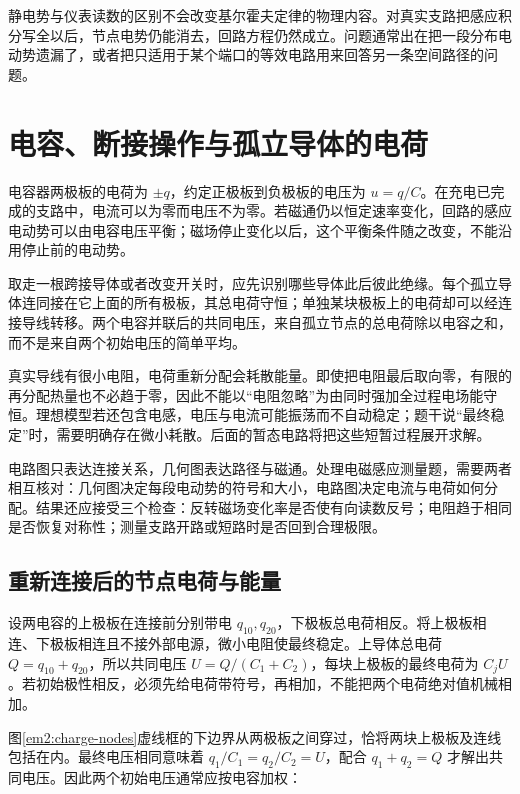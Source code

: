 静电势与仪表读数的区别不会改变基尔霍夫定律的物理内容。对真实支路把感应积分写全以后，节点电势仍能消去，回路方程仍然成立。问题通常出在把一段分布电动势遗漏了，或者把只适用于某个端口的等效电路用来回答另一条空间路径的问题。



\section{电容、断接操作与孤立导体的电荷}

电容器两极板的电荷为 $\pm q$，约定正极板到负极板的电压为 $u=q/C$。在充电已完成的支路中，电流可以为零而电压不为零。若磁通仍以恒定速率变化，回路的感应电动势可以由电容电压平衡；磁场停止变化以后，这个平衡条件随之改变，不能沿用停止前的电动势。


取走一根跨接导体或者改变开关时，应先识别哪些导体此后彼此绝缘。每个孤立导体连同接在它上面的所有极板，其总电荷守恒；单独某块极板上的电荷却可以经连接导线转移。两个电容并联后的共同电压，来自孤立节点的总电荷除以电容之和，而不是来自两个初始电压的简单平均。


真实导线有很小电阻，电荷重新分配会耗散能量。即使把电阻最后取向零，有限的再分配热量也不必趋于零，因此不能以“电阻忽略”为由同时强加全过程电场能守恒。理想模型若还包含电感，电压与电流可能振荡而不自动稳定；题干说“最终稳定”时，需要明确存在微小耗散。后面的暂态电路将把这些短暂过程展开求解。


电路图只表达连接关系，几何图表达路径与磁通。处理电磁感应测量题，需要两者相互核对：几何图决定每段电动势的符号和大小，电路图决定电流与电荷如何分配。结果还应接受三个检查：反转磁场变化率是否使有向读数反号；电阻趋于相同是否恢复对称性；测量支路开路或短路时是否回到合理极限。



\subsection{重新连接后的节点电荷与能量}



设两电容的上极板在连接前分别带电 $q_{10},q_{20}$，下极板总电荷相反。将上极板相连、下极板相连且不接外部电源，微小电阻使最终稳定。上导体总电荷 $Q=q_{10}+q_{20}$，所以共同电压 $U=Q/(C_1+C_2)$，每块上极板的最终电荷为 $C_jU$。若初始极性相反，必须先给电荷带符号，再相加，不能把两个电荷绝对值机械相加。


图\ref{em2:charge-nodes}虚线框的下边界从两极板之间穿过，恰将两块上极板及连线包括在内。最终电压相同意味着 $q_1/C_1=q_2/C_2=U$，配合 $q_1+q_2=Q$ 才解出共同电压。因此两个初始电压通常应按电容加权：

